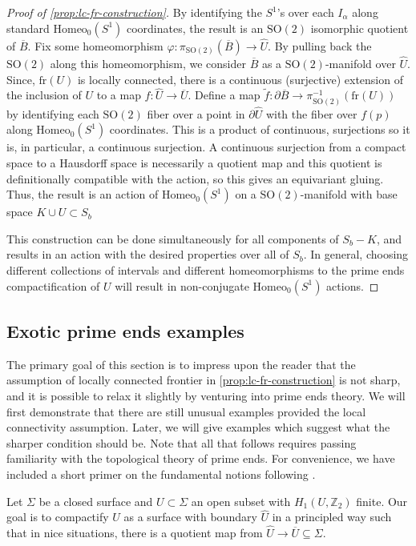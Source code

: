 \documentclass[10pt, oneside]{article}
\newcommand{\Z}{\mathbb{Z}}
\newcommand{\SO}[1][2]{\text{SO}(#1)}
\newcommand{\homeo}[1][S^1]{\text{Homeo}_0(#1)}
\newcommand{\cl}[1]{\overline{#1}}
\newcommand{\fr}[1]{\text{fr}(#1)}
\theoremstyle{definition}
\theoremstyle{definition}
\begin{document}
\begin{proof}[Proof of \cref{prop:lc-fr-construction}]
    By identifying the $S^1$'s over each $I_\alpha$ along standard $\homeo$ coordinates, the result is an $\SO$ isomorphic quotient of $\cl{B}$. Fix some homeomorphism $\varphi: \pi_{\SO}(\cl{B}) \to \hat{U}$. By pulling back the $\SO$ along this homeomorphism, we consider $\cl{B}$ as a $\SO$-manifold over $\hat{U}$. Since, $\fr{U}$ is locally connected, there is a continuous (surjective) extension of the inclusion of $U$ to a map $f:\hat{U}\to \cl{U}$\cite{mather:TopologicalProofs}. Define a map $\tilde{f}:\partial\cl{B}\to\pi_{\SO}^{-1}(\fr{U})$ by identifying each $\SO$ fiber over a point in $\partial\hat{U}$ with the fiber over $f(p)$ along $\homeo$ coordinates. This is a product of continuous, surjections so it is, in particular, a continuous surjection. A continuous surjection from a compact space to a Hausdorff space is necessarily a quotient map and this quotient is definitionally compatible with the action, so this gives an equivariant gluing. Thus, the result is an action of $\homeo$ on a $\SO$-manifold with base space $K\cup U\subset S_b$

    This construction can be done simultaneously for all components of $S_b - K$, and results in an action with the desired properties over all of $S_b$. In general, choosing different collections of intervals and different homeomorphisms to the prime ends compactification of $U$ will result in non-conjugate $\homeo$ actions.
\end{proof}

\subsection{Exotic prime ends examples}\label{subsec:prime-ends}
The primary goal of this section is to impress upon the reader that the assumption of locally connected frontier in \cref{prop:lc-fr-construction} is not sharp, and it is possible to relax it slightly by venturing into prime ends theory. We will first demonstrate that there are still unusual examples provided the local connectivity assumption. Later, we will give examples which suggest what the sharper condition should be. Note that all that follows requires passing familiarity with the topological theory of prime ends. For convenience, we have included a short primer on the fundamental notions following \cite{mather:TopologicalProofs}. 

Let $\Sigma$ be a closed surface and $U\subset \Sigma$ an open subset with $H_1(U, \Z_2)$ finite. Our goal is to compactify $U$ as a surface with boundary $\hat{U}$ in a principled way such that in nice situations, there is a quotient map from $\hat{U}\to\cl{U}\subseteq\Sigma$. 
\end{document}
